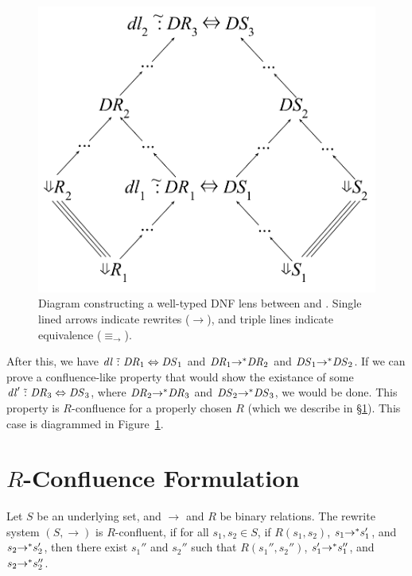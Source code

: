 \documentclass{easychair}
\begin{document}
\begin{figure}
  \centering
    \includegraphics[scale=.4]{equiv-case.pdf}
    \caption{Diagram constructing a well-typed DNF lens between
       and . Single lined
      arrows indicate rewrites ($\rightarrow$), and triple lines indicate
      equivalence ($\equiv_{\rightarrow}$).}
    \label{fig:equiv-case}
\end{figure}

After this, we have $\mathit{dl} \,\,\tilde{:}\,\, \mathit{DR}_1 \Leftrightarrow
\mathit{DS}_1$ and $\mathit{DR}_1 {\rightarrow}^* \mathit{DR}_2$ and
$\mathit{DS}_1 {\rightarrow}^* \mathit{DS}_2$. If we can prove a
confluence-like property that would show the existance of some $\mathit{dl}'
\,\,\tilde{:}\,\, \mathit{DR}_3 \Leftrightarrow \mathit{DS}_3$, where
$\mathit{DR}_2 {\rightarrow}^* \mathit{DR}_3$ and $\mathit{DS}_2
{\rightarrow}^* \mathit{DS}_3$, we would be done. This property is
$R$-confluence for a properly chosen $R$ (which we describe in \S\ref{sec:rcf}).
This case is diagrammed in Figure~\ref{fig:equiv-case}.

\section{$R$-Confluence Formulation}
\label{sec:rcf}
Let $S$ be an underlying set, and $\rightarrow$ and $R$ be
binary relations. The rewrite system $(S,\rightarrow)$ is $R$-confluent, if for
all $s_1,s_2 \in S$, if $R(s_1,s_2)$, $s_1 {\rightarrow}^* s_1'$, and $s_2
{\rightarrow}^* s_2'$, then there exist $s_1''$ and $s_2''$ such that
$R(s_1'',s_2'')$, $s_1' {\rightarrow}^* s_1''$, and $s_2
{\rightarrow}^* s_2''$.
\end{document}
